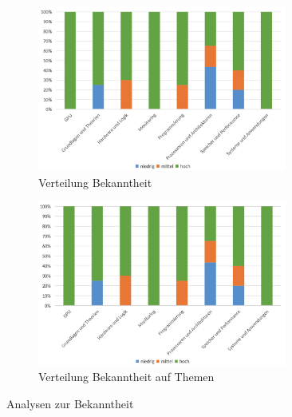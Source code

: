 \begin{figure}[!htbp]
    \centering
    \begin{subfigure}[b]{0.48\textwidth}
        \centering
        \includegraphics[width=0.90\textwidth]{graphics_sim/15-bekanntheit.png}
        \caption{Verteilung Bekanntheit}
        \label{fig:15-bekanntheit}
    \end{subfigure}
    \hfill
    \begin{subfigure}[b]{0.48\textwidth}
        \centering
        \includegraphics[width=0.90\textwidth]{graphics_sim/16-bekanntheit-thema.png}
        \caption{Verteilung Bekanntheit auf Themen}
        \label{fig:16-bekanntheit-thema}
    \end{subfigure}
    \caption{Analysen zur Bekanntheit}
    \label{fig:bekanntheit-gesamt}
\end{figure}
